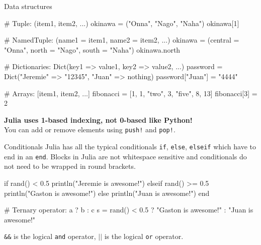 \documentclass{beamer}
\newenvironment{Boxx}{\begin{tcolorbox}[standard jigsaw, opacityframe=0.8, opacityback=0.0]}{\end{tcolorbox}}
\begin{document}
\begin{frame}[fragile]{Data structures}
	\begin{Boxx}
	\begin{jllisting}
  # Tuple: (item1, item2, ...)
  okinawa = ("Onna", "Nago", "Naha")
  okinawa[1] 
		
  # NamedTuple: (name1 = item1, name2 = item2, ...)
  okinawa = (central = "Onna", north = "Nago", south = "Naha")
  okinawa.north 
		
  # Dictionaries: Dict(key1 => value1, key2 => value2, ...)
  password = Dict("Jeremie" => "12345", "Juan" => nothing)
  password["Juan"] = "4444"
		
  # Arrays: [item1, item2, ...]
  fibonacci = [1, 1, "two", 3, "five", 8, 13]
  fibonacci[3] = 2
	\end{jllisting}
\end{Boxx}

\textbf{Julia uses 1-based indexing, not 0-based like Python!}\\
You can add or remove elements using \verb|push!| and \verb|pop!|.
\end{frame}


\begin{frame}[fragile]{Conditionals}
  Julia has all the typical conditionals \verb|if|, \verb|else|, \verb|elseif| which have to end in an \verb|end|.
  Blocks in Julia are not whitespace sensitive and conditionals do not need to be wrapped in round brackets.
  \begin{Boxx}
  \begin{jllisting}
  if rand() < 0.5
    println("Jeremie is awesome!")
  elseif rand() >= 0.5
    println("Gaston is awesome!")
  else
    println("Juan is awesome!")
  end
  
  # Ternary operator: a ? b : c
  s = rand() < 0.5 ? "Gaston  is awesome!" : "Juan  is awesome!"
\end{jllisting}
\end{Boxx}

\verb|&&| is the logical \verb|and| operator, $||$ is the logical \verb|or| operator.
\end{frame}
\end{document}
